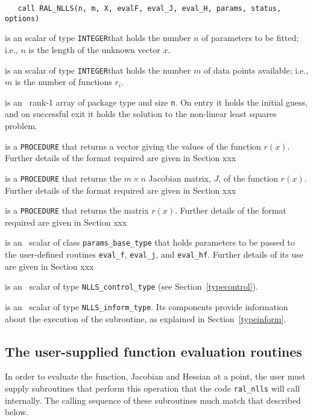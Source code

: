 \documentclass{hslspec}
\newcommand{\scalarintegerii}{is an \intentin scalar of type {\tt INTEGER}}
\begin{document}
\begin{verbatim}
   call RAL_NLLS(n, m, X, evalF, eval_J, eval_H, params, status, options)
\end{verbatim}

\begin{description}
 \scalarintegerii that holds the number $n$ of 
parameters to be fitted; i.e., $n$ is the length of the unknown vector $x$.

 \scalarintegerii that holds the number $m$ of 
data points available; i.e., $m$ is the number of functions $r_i$.

 is an \intentinout\  rank-1 array of package type 
and size {\tt n}.  On entry it holds the initial guess, and on 
successful exit it holds the solution to the non-linear least squares problem.

 is a {\tt PROCEDURE} that returns a vector giving the values of the function $r(x)$.  Further details of the format required are given in Section {\color{red}xxx}

 is a {\tt PROCEDURE} that returns the $m \times n$ Jacobian matrix, $J$, of the function $r(x)$.  Further details of the format required are given in Section {\color{red}xxx}

 is a {\tt PROCEDURE} that returns the matrix $r(x)$.  Further details of the format required are given in Section {\color{red}xxx}

 is an \inentin\ scalar of class {\tt params\_base\_type} that holds parameters to 
be passed to the user-defined routines {\tt eval\_f}, {\tt eval\_j}, and {\tt eval\_hf}. Further details of its use are given in Section {\color{red}xxx}

is an \intentin\  scalar  of type {\tt NLLS\_control\_type}
(see Section~\ref{typecontrol}).

 is an \intentinout\ scalar of type 
{\tt NLLS\_inform\_type}. Its components provide information about the execution
of the subroutine, as explained in Section~\ref{typeinform}.

\end{description}


\subsection{The user-supplied function evaluation routines}

In order to evaluate the function, Jacobian and Hessian at a point, the user must supply
subroutines that perform this operation that the code {\tt ral\_nlls} will call internally.  The calling sequence of these subroutines much match that described below.
\end{document}
